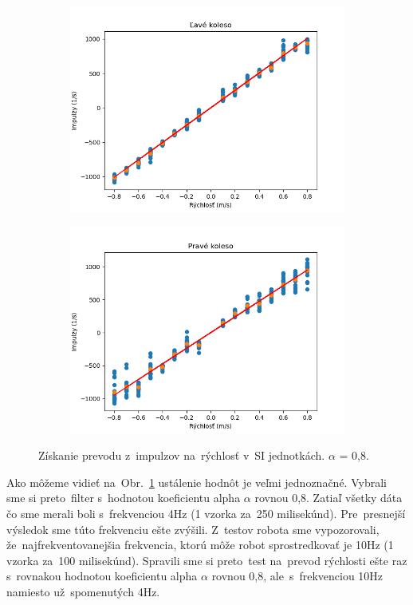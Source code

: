 \begin{figure}[!htbp]
	\begin{subfigure}{0.5\textwidth}
		\includegraphics[width=\textwidth]{img/lw_08250.png}
	\end{subfigure}
	\hfill
	\begin{subfigure}{0.5\textwidth}
		\includegraphics[width=\textwidth]{img/rw_08250.png}
	\end{subfigure}
	\caption{Získanie prevodu z~impulzov na~rýchlosť v~SI jednotkách. $\alpha$ = 0,8.}
	\label{fig:rw_lw_08250}
\end{figure}

Ako môžeme vidieť na~Obr.~\ref{fig:rw_lw_08250} ustálenie hodnôt je veľmi jednoznačné. Vybrali sme si preto~filter s~hodnotou
koeficientu alpha $\alpha$ rovnou 0,8. Zatiaľ všetky dáta čo sme merali boli s~frekvenciou 4Hz (1 vzorka za~250 milisekúnd).
Pre~presnejší výsledok sme túto frekvenciu ešte zvýšili. Z~testov robota sme vypozorovali, že~najfrekventovanejšia frekvencia,
ktorú môže robot sprostredkovať je 10Hz (1 vzorka za~100 milisekúnd). Spravili sme si preto~test na~prevod rýchlosti ešte raz
s~rovnakou hodnotou koeficientu alpha $\alpha$ rovnou 0,8, ale~s~frekvenciou 10Hz namiesto už~spomenutých 4Hz.

